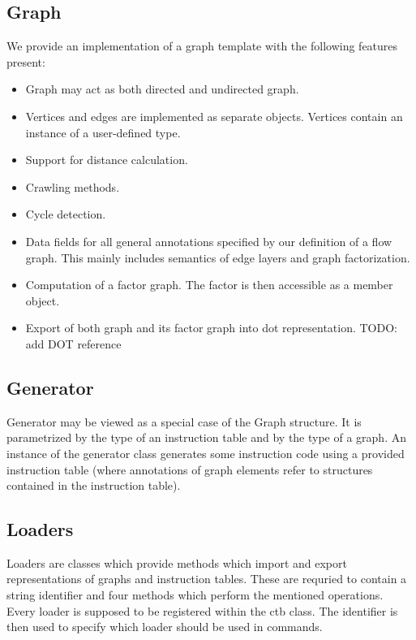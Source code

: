 \subsection{Graph}

  We provide an implementation of a graph template with the following features present:

  \begin{itemize}
    \item Graph may act as both directed and undirected graph.
    \item Vertices and edges are implemented as separate objects. Vertices contain an instance of a user-defined type. 
    \item Support for distance calculation.
    \item Crawling methods.
    \item Cycle detection.
    \item Data fields for all general annotations specified by our definition of a flow graph. This mainly includes semantics of edge layers and graph factorization.
    \item Computation of a factor graph. The factor is then accessible as a member object.
    \item Export of both graph and its factor graph into dot representation. TODO: add DOT reference
  \end{itemize}

\subsection{Generator}
  Generator may be viewed as a special case of the Graph structure. It is parametrized by the type of an instruction table and by the type of a graph. An instance of the generator class generates some instruction code using a provided instruction table (where annotations of graph elements refer to structures contained in the instruction table). 

\subsection{Loaders}
  Loaders are classes which provide methods which import and export representations of graphs and instruction tables. These are requried to contain a string identifier and four methods which perform the mentioned operations. Every loader is supposed to be registered within the ctb class. The identifier is then used to specify which loader should be used in commands.

